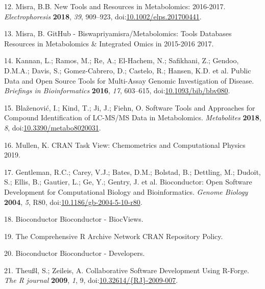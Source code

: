 \documentclass[]{article}
\begin{document}
\leavevmode\hypertarget{ref-misra_2018}{}%
12. Misra, B.B. New Tools and Resources in Metabolomics: 2016-2017. \emph{Electrophoresis} \textbf{2018}, \emph{39}, 909--923, doi:\href{https://doi.org/10.1002/elps.201700441}{10.1002/elps.201700441}.

\leavevmode\hypertarget{ref-misra_website_2017}{}%
13. Misra, B. GitHub - Biswapriyamisra/Metabolomics: Tools Databases Resources in Metabolomics \& Integrated Omics in 2015-2016 2017.

\leavevmode\hypertarget{ref-kannan_2016}{}%
14. Kannan, L.; Ramos, M.; Re, A.; El-Hachem, N.; Safikhani, Z.; Gendoo, D.M.A.; Davis, S.; Gomez-Cabrero, D.; Castelo, R.; Hansen, K.D. et al. Public Data and Open Source Tools for Multi-Assay Genomic Investigation of Disease. \emph{Briefings in Bioinformatics} \textbf{2016}, \emph{17}, 603--615, doi:\href{https://doi.org/10.1093/bib/bbv080}{10.1093/bib/bbv080}.

\leavevmode\hypertarget{ref-blaenovi_2018}{}%
15. Blaženović, I.; Kind, T.; Ji, J.; Fiehn, O. Software Tools and Approaches for Compound Identification of LC-MS/MS Data in Metabolomics. \emph{Metabolites} \textbf{2018}, \emph{8}, doi:\href{https://doi.org/10.3390/metabo8020031}{10.3390/metabo8020031}.

\leavevmode\hypertarget{ref-mullen_website_2019}{}%
16. Mullen, K. CRAN Task View: Chemometrics and Computational Physics 2019.

\leavevmode\hypertarget{ref-gentleman_2004}{}%
17. Gentleman, R.C.; Carey, V.J.; Bates, D.M.; Bolstad, B.; Dettling, M.; Dudoit, S.; Ellis, B.; Gautier, L.; Ge, Y.; Gentry, J. et al. Bioconductor: Open Software Development for Computational Biology and Bioinformatics. \emph{Genome Biology} \textbf{2004}, \emph{5}, R80, doi:\href{https://doi.org/10.1186/gb-2004-5-10-r80}{10.1186/gb-2004-5-10-r80}.

\leavevmode\hypertarget{ref-bioconductor_website_nda}{}%
18. Bioconductor Bioconductor - BiocViews.

\leavevmode\hypertarget{ref-thecomprehensiverarchivenetwork_website_nd}{}%
19. The Comprehensive R Archive Network CRAN Repository Policy.

\leavevmode\hypertarget{ref-bioconductor_website_nd}{}%
20. Bioconductor Bioconductor - Developers.

\leavevmode\hypertarget{ref-theul_2009}{}%
21. Theußl, S.; Zeileis, A. Collaborative Software Development Using R-Forge. \emph{The R journal} \textbf{2009}, \emph{1}, 9, doi:\href{https://doi.org/10.32614/\%7BRJ\%7D-2009-007}{10.32614/\{RJ\}-2009-007}.
\end{document}
